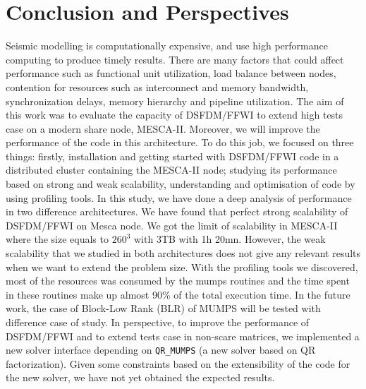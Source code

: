 \chapter{Conclusion and Perspectives}
Seismic modelling is computationally expensive, and use high performance computing to produce timely results. There are many factors that could affect performance such as functional unit utilization, load balance between nodes, contention for resources such as interconnect and memory bandwidth, synchronization delays, memory hierarchy and pipeline utilization. The aim of this work was to evaluate the capacity of DSFDM/FFWI to extend high tests case on a modern share node, MESCA-II. Moreover, we will improve the performance of the code in this architecture. To do this job, we focused on three things: firstly, installation and getting started with DSFDM/FFWI code in a distributed cluster containing the MESCA-II node; studying its performance based on strong and weak scalability, understanding and optimisation of code by using profiling tools. In this study, we have done a deep analysis of performance in two difference architectures. We have found that perfect strong scalability of DSFDM/FFWI on Mesca node. We got the limit of scalability in MESCA-II where the size equals to $260^3$ with 3TB with 1h 20mn. However, the weak scalability that we studied in both architectures does not give any relevant results when we want to extend the problem size. 
With the profiling tools we discovered, most of the resources was consumed by the mumps routines and the time spent in these routines make up almost 90\% of the total execution time. In the future work, the case of Block-Low Rank (BLR) of  MUMPS will be  tested with difference case of study. In perspective, to improve the performance of DSFDM/FFWI and to extend tests case in non-scare matrices, we implemented a new solver interface depending 
on \verb|QR_MUMPS| (a new solver based on QR factorization). Given some constraints based on the extensibility of the code for the new solver, we have not yet obtained the expected results. 
 